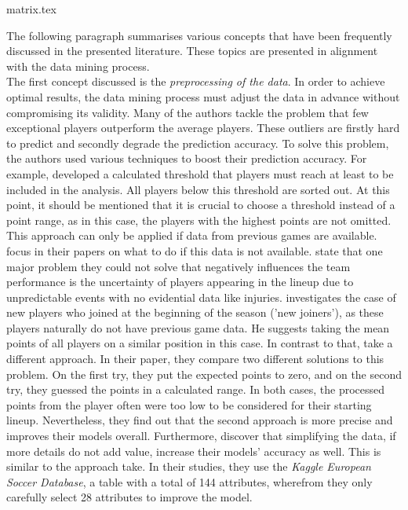 {matrix.tex}

The following paragraph summarises various concepts that have been frequently discussed in the presented literature. These topics are presented in alignment with the data mining process.  \\
\indent The first concept discussed is the \emph{preprocessing of the data}. In order to achieve optimal results, the data mining process must adjust the data in advance without compromising its validity. Many of the authors tackle the problem that few exceptional players outperform the average players. These outliers are firstly hard to predict and secondly degrade the prediction accuracy. To solve this problem, the authors used various techniques to boost their prediction accuracy. For example, \citet{landers_machine_2017} developed a calculated threshold that players must reach at least to be included in the analysis. All players below this threshold are sorted out. At this point, it should be mentioned that it is crucial to choose a threshold instead of a point range, as in this case, the players with the highest points are not omitted. This approach can only be applied if data from previous games are available. \citet{lutz_fantasy_2015,egidi_bayesian_2018,yurko_nflwar_2019} focus in their papers on what to do if this data is not available. \citet{yurko_nflwar_2019} state that one major problem they could not solve that negatively influences the team performance is the uncertainty of players appearing in the lineup due to unpredictable events with no evidential data like injuries. \citet{lutz_fantasy_2015} investigates the case of new players who joined at the beginning of the season ('new joiners'), as these players naturally do not have previous game data. He suggests taking the mean points of all players on a similar position in this case. \parencite[cf.][, p. 3]{lutz_fantasy_2015} In contrast to that, \citet{egidi_bayesian_2018} take a different approach. In their paper, they compare two different solutions to this problem. On the first try, they put the expected points to zero, and on the second try, they guessed the points in a calculated range. In both cases, the processed points from the player often were too low to be considered for their starting lineup. Nevertheless, they find out that the second approach is more precise and improves their models overall. Furthermore, \citet{egidi_bayesian_2018} discover that simplifying the data, if more details do not add value, increase their models' accuracy as well. This is similar to the approach \citet{deng_analysis_2020} take. In their studies, they use the \emph{Kaggle European Soccer Database}, a table with a total of 144 attributes, wherefrom they only carefully select 28 attributes to improve the model. \\

